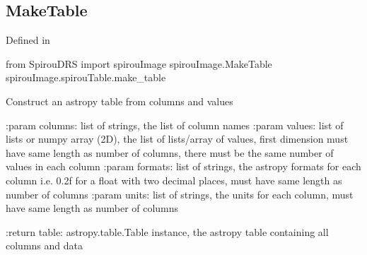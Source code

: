\noindent\begin{minipage}{\textwidth}
\subsection{MakeTable}

Defined in \spirouImage{}

\begin{pythonbox}
from SpirouDRS import spirouImage
spirouImage.MakeTable
spirouImage.spirouTable.make_table
\end{pythonbox}

\begin{pythondocstring}
Construct an astropy table from columns and values

:param columns: list of strings, the list of column names
:param values: list of lists or numpy array (2D), the list of lists/array
               of values, first dimension must have same length as number
               of columns, there must be the same number of values in each
               column
:param formats: list of strings, the astropy formats for each column
                i.e. 0.2f  for a float with two decimal places, must have
                same length as number of columns
:param units: list of strings, the units for each column, must have
              same length as number of columns

:return table: astropy.table.Table instance, the astropy table containing
               all columns and data
\end{pythondocstring}
\end{minipage}


